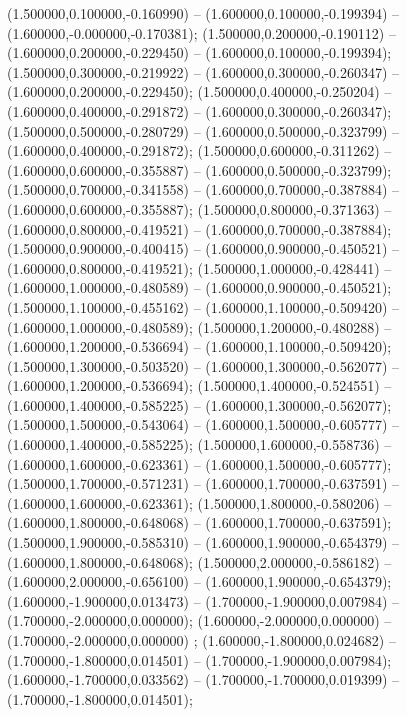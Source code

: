  (1.500000,0.100000,-0.160990) -- (1.600000,0.100000,-0.199394) -- (1.600000,-0.000000,-0.170381);
 (1.500000,0.200000,-0.190112) -- (1.600000,0.200000,-0.229450) -- (1.600000,0.100000,-0.199394);
 (1.500000,0.300000,-0.219922) -- (1.600000,0.300000,-0.260347) -- (1.600000,0.200000,-0.229450);
 (1.500000,0.400000,-0.250204) -- (1.600000,0.400000,-0.291872) -- (1.600000,0.300000,-0.260347);
 (1.500000,0.500000,-0.280729) -- (1.600000,0.500000,-0.323799) -- (1.600000,0.400000,-0.291872);
 (1.500000,0.600000,-0.311262) -- (1.600000,0.600000,-0.355887) -- (1.600000,0.500000,-0.323799);
 (1.500000,0.700000,-0.341558) -- (1.600000,0.700000,-0.387884) -- (1.600000,0.600000,-0.355887);
 (1.500000,0.800000,-0.371363) -- (1.600000,0.800000,-0.419521) -- (1.600000,0.700000,-0.387884);
 (1.500000,0.900000,-0.400415) -- (1.600000,0.900000,-0.450521) -- (1.600000,0.800000,-0.419521);
 (1.500000,1.000000,-0.428441) -- (1.600000,1.000000,-0.480589) -- (1.600000,0.900000,-0.450521);
 (1.500000,1.100000,-0.455162) -- (1.600000,1.100000,-0.509420) -- (1.600000,1.000000,-0.480589);
 (1.500000,1.200000,-0.480288) -- (1.600000,1.200000,-0.536694) -- (1.600000,1.100000,-0.509420);
 (1.500000,1.300000,-0.503520) -- (1.600000,1.300000,-0.562077) -- (1.600000,1.200000,-0.536694);
 (1.500000,1.400000,-0.524551) -- (1.600000,1.400000,-0.585225) -- (1.600000,1.300000,-0.562077);
 (1.500000,1.500000,-0.543064) -- (1.600000,1.500000,-0.605777) -- (1.600000,1.400000,-0.585225);
 (1.500000,1.600000,-0.558736) -- (1.600000,1.600000,-0.623361) -- (1.600000,1.500000,-0.605777);
 (1.500000,1.700000,-0.571231) -- (1.600000,1.700000,-0.637591) -- (1.600000,1.600000,-0.623361);
 (1.500000,1.800000,-0.580206) -- (1.600000,1.800000,-0.648068) -- (1.600000,1.700000,-0.637591);
 (1.500000,1.900000,-0.585310) -- (1.600000,1.900000,-0.654379) -- (1.600000,1.800000,-0.648068);
 (1.500000,2.000000,-0.586182) -- (1.600000,2.000000,-0.656100) -- (1.600000,1.900000,-0.654379);
 (1.600000,-1.900000,0.013473) -- (1.700000,-1.900000,0.007984) -- (1.700000,-2.000000,0.000000);
 (1.600000,-2.000000,0.000000) -- (1.700000,-2.000000,0.000000) ;
 (1.600000,-1.800000,0.024682) -- (1.700000,-1.800000,0.014501) -- (1.700000,-1.900000,0.007984);
 (1.600000,-1.700000,0.033562) -- (1.700000,-1.700000,0.019399) -- (1.700000,-1.800000,0.014501);
